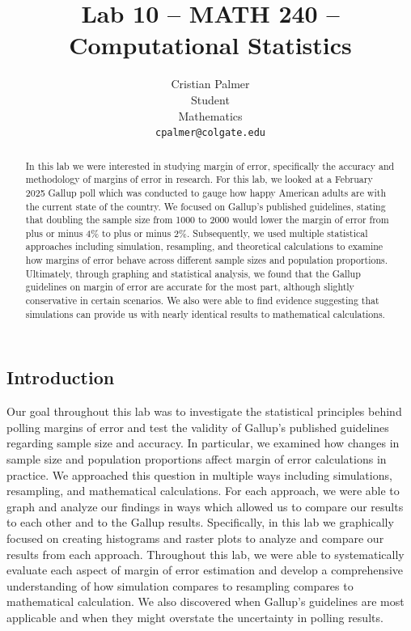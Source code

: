\documentclass{article}\usepackage[]{graphicx}\usepackage[]{xcolor}
\begin{document}
\vspace{-1in}
\title{Lab 10 -- MATH 240 -- Computational Statistics}

\author{
  Cristian Palmer \\
  Student \\
  Mathematics  \\
  {\tt cpalmer@colgate.edu}
}

\date{}

\maketitle

\begin{multicols}{2}
\begin{abstract}
In this lab we were interested in studying margin of error, specifically the accuracy and methodology of margins of error in research. For this lab, we looked at a February 2025 Gallup poll which was conducted to gauge how happy American adults are with the current state of the country. We focused on Gallup's published guidelines, stating that doubling the sample size from 1000 to 2000 would lower the margin of error from plus or minus 4\% to plus or minus 2\%. Subsequently, we used multiple statistical approaches including simulation, resampling, and theoretical calculations to examine how margins of error behave across different sample sizes and population proportions. Ultimately, through graphing and statistical analysis, we found that the Gallup guidelines on margin of error are accurate for the most part, although slightly conservative in certain scenarios. We also were able to find evidence suggesting that simulations can provide us with nearly identical results to mathematical calculations.

\end{abstract}

\section{Introduction}
Our goal throughout this lab was to investigate the statistical principles behind polling margins of error and test the validity of Gallup's published guidelines regarding sample size and accuracy. In particular, we examined how changes in sample size and population proportions affect margin of error calculations in practice. We approached this question in multiple ways including simulations, resampling, and mathematical calculations. For each approach, we were able to graph and analyze our findings in ways which allowed us to compare our results to each other and to the Gallup results. Specifically, in this lab we graphically focused on creating histograms and raster plots to analyze and compare our results from each approach. Throughout this lab, we were able to systematically evaluate each aspect of margin of error estimation and develop a comprehensive understanding of how simulation compares to resampling compares to mathematical calculation. We also discovered when Gallup's guidelines are most applicable and when they might overstate the uncertainty in polling results. 


\end{multicols}
\end{document}
